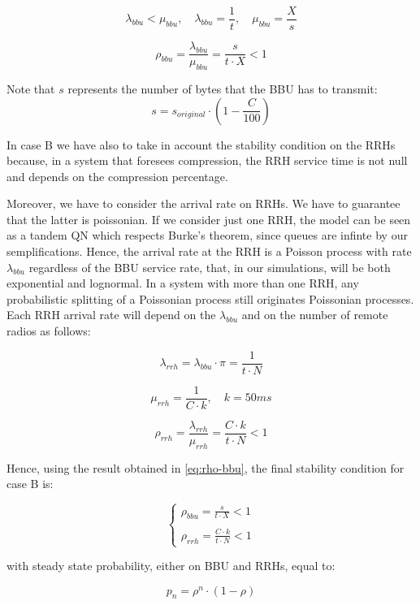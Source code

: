 \documentclass[11pt,a4paper,oneside, openright]{article}
\begin{document}
$$ \lambda_{bbu} < \mu_{bbu}, \quad \lambda_{bbu} = \frac{1}{t}, \quad \mu_{bbu} = \frac{X}{s}$$

\begin{equation} \label{eq:rho-bbu}
\rho_{bbu} = \frac{\lambda_{bbu}}{\mu_{bbu}} = \frac{s}{t \cdot X} < 1
\end{equation}

Note that $s$ represents the number of bytes that the BBU has to transmit:
$$s = s_{original}\cdot(1-\frac{C}{100})$$

In case B we have also to take in account the stability condition on the RRHs because, in a system that foresees compression, the RRH service time is not null and depends on the compression percentage. 

Moreover, we have to consider the arrival rate on RRHs.
We have to guarantee that the latter is poissonian. If we consider just one RRH, the model can be seen as a tandem QN which respects Burke's theorem, since queues are infinte by our semplifications. Hence, the arrival rate at the RRH is a Poisson process with rate $ \lambda_{bbu} $ regardless of the BBU service rate, that, in our simulations, will be both exponential and lognormal. 
In a system with more than one RRH, any probabilistic splitting of a Poissonian process still originates Poissonian processes. Each RRH arrival rate will depend on the $ \lambda_{bbu} $ and on the number of remote radios as follows:

$$ \lambda_{rrh} = \lambda_{bbu} \cdot \pi = \frac{1}{t \cdot N} $$

$$ \mu_{rrh} = \frac{1}{C \cdot k}, \quad k = 50ms $$

\begin{equation} \label{eq:rho-rrh}
\rho_{rrh} = \frac{\lambda_{rrh}}{\mu_{rrh}} = \frac{C \cdot k}{t \cdot N} < 1
\end{equation}

Hence, using the result obtained in \ref{eq:rho-bbu}, the final stability condition for case B is:

$$ \begin{cases} \rho_{bbu} = \frac{s}{t \cdot X} < 1 \\ \\ \rho_{rrh} = \frac{C \cdot k}{t \cdot N} < 1 \end{cases} $$

with steady state probability, either on BBU and RRHs, equal to:

$$ p_{n} = \rho^n \cdot (1 - \rho) $$
\end{document}
